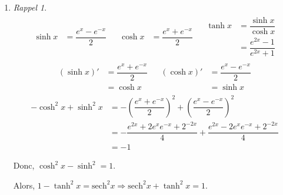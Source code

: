 \documentclass{report}
\newcommand*{\dint}[3]{\displaystyle\int_{#1}^{#2}#3}
\newcommand*{\sech}{\mathrm{sech}}
\theoremstyle{definition}
\theoremstyle{remark}
\newtheorem*{exem}{Exemple}
\newtheorem*{rapp}{Rappel}
\begin{document}
\begin{enumerate}
		On pose $x=a\sin t$. On a $dx=a\cos t dt$.
		\begin{exem}
			\begin{align*}
				\dint{}{}{x^2\sqrt{a^2-x^2} dx}&= \dint{}{}{a^2\sin^2t \sqrt{a^2-a^2\sin^2t} a\cos t dt}\\
				&= \dint{}{}{a^4 \sin^2t \cos^2 t dt}\\
				&= \dint{}{}{a^4 \dfrac{1}{4} \sin^2 2t dt}\\
				&= \dint{}{}{\dfrac{a^4}{4} \cdot \dfrac{1-\cos 4t}{2} dt}\\
				&= \dfrac{a^4}{8} \left[ t - \dfrac{\sin 4t}{4} \right]
			\end{align*}
		\end{exem}
		\newpage
		\item
		\begin{rapp}
			\begin{align*}
				\begin{split}
					\sinh x&= \dfrac{e^x-e^{-x}}{2}
				\end{split}
				&
				\begin{split}
					\cosh x&= \dfrac{e^x+e^{-x}}{2}
				\end{split}
				&
				\begin{split}
					\tanh x&= \dfrac{\sinh x}{\cosh x}\\
					&= \dfrac{e^{2x}-1}{e^{2x}+1}
				\end{split}
			\end{align*}
			\begin{align*}
				\begin{split}
					(\sinh x)'&= \dfrac{e^x+e^{-x}}{2}\\
					&= \cosh x
				\end{split}
				&
				\begin{split}
					(\cosh x)'&= \dfrac{e^x-e^{-x}}{2}\\
					&= \sinh x
				\end{split}
			\end{align*}
			\begin{align*}
					-\cosh^2x+\sinh^2x&= -\left( \dfrac{e^x+e^{-x}}{2} \right)^2 + \left( \dfrac{e^x-e^{-x}}{2} \right)^2\\
					&= -\dfrac{e^{2x}+2e^xe^{-x}+2^{-2x}}{4} + \dfrac{e^{2x}-2e^xe^{-x}+2^{-2x}}{4}\\
					&= -1
			\end{align*}

			Donc, $\cosh^2x-\sinh^2=1$.

			Alors, $1-\tanh^2x = \sech^2x \Rightarrow \sech^2x+\tanh^2x = 1$.


\end{rapp}
\end{enumerate}
\end{document}
